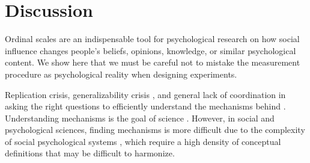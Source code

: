 \documentclass[
  abstract]{article}
\begin{document}
\section{Discussion}\label{discussion}

Ordinal scales are an indispensable tool for psychological research on
how social influence changes people's beliefs, opinions, knowledge, or
similar psychological content. We show here that we must be careful not
to mistake the measurement procedure as psychological reality when
designing experiments.

Replication crisis, generalizability crisis \autocite{Yarkoni2022}, and
general lack of coordination in asking the right questions to
efficiently understand the mechanisms behind . Understanding mechanisms
is the goal of science \autocite{Machamer2000,Craver2006}. However, in
social and psychological sciences, finding mechanisms is more difficult
due to the complexity of social psychological systems
\autocite{Dubova2023}, which require a high density of conceptual
definitions that may be difficult to harmonize.


\printbibliography[title=References]

\appendix

\end{document}
